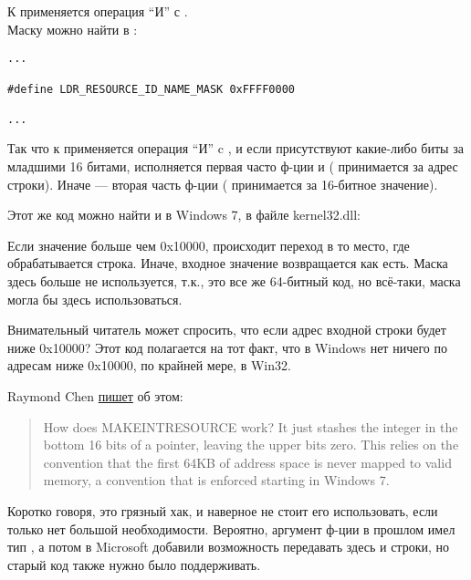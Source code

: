 К  применяется операция ``И'' с . \\
Маску можно найти в :

\begin{lstlisting}[style=customc]
...

#define LDR_RESOURCE_ID_NAME_MASK 0xFFFF0000

...
\end{lstlisting}

Так что к  применяется операция ``И'' c , и если присутствуют какие-либо биты за младшими 16 битами,
исполняется первая часто ф-ции и ( принимается за адрес строки).
Иначе --- вторая часть ф-ции ( принимается за 16-битное значение).

Этот же код можно найти и в Windows 7, в файле kernel32.dll:



Если значение больше чем 0x10000, происходит переход в то место, где обрабатывается строка.
Иначе, входное значение  возвращается как есть.
Маска  здесь больше не используется, т.к., это все же 64-битный код, но всё-таки,
маска  могла бы здесь использоваться.

Внимательный читатель может спросить, что если адрес входной строки будет ниже 0x10000?
Этот код полагается на тот факт, что в Windows нет ничего по адресам ниже 0x10000, по крайней мере, в Win32.

Raymond Chen \href{https://blogs.msdn.microsoft.com/oldnewthing/20130925-00/?p=3123}{пишет} об этом:

\begin{framed}
\begin{quotation}
How does MAKE­INT­RESOURCE work? It just stashes the integer in the bottom 16 bits of a pointer, leaving the upper bits zero. This relies on the convention that the first 64KB of address space is never mapped to valid memory, a convention that is enforced starting in Windows 7.
\end{quotation}
\end{framed}

Коротко говоря, это грязный хак, и наверное не стоит его использовать, если только нет большой необходимости.
Вероятно, аргумент ф-ции  в прошлом имел тип , а потом в Microsoft добавили возможность
передавать здесь и строки, но старый код также нужно было поддерживать.

